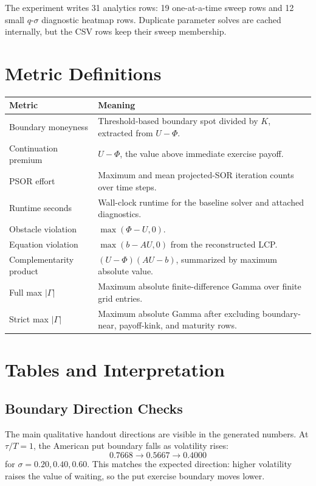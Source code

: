 \documentclass[11pt,a4paper]{article}
\begin{document}
The experiment writes 31 analytics rows: 19 one-at-a-time sweep rows and 12 small \(q\)-\(\sigma\)
diagnostic heatmap rows. Duplicate parameter solves are cached internally, but the CSV rows keep
their sweep membership.

\section{Metric Definitions}

\begin{longtable}{L{0.26\textwidth} L{0.56\textwidth}}
\toprule
Metric & Meaning \\
\midrule
\endhead
Boundary moneyness & Threshold-based boundary spot divided by \(K\), extracted from \(U-\Phi\). \\
Continuation premium & \(U-\Phi\), the value above immediate exercise payoff. \\
PSOR effort & Maximum and mean projected-SOR iteration counts over time steps. \\
Runtime seconds & Wall-clock runtime for the baseline solver and attached diagnostics. \\
Obstacle violation & \(\max(\Phi-U,0)\). \\
Equation violation & \(\max(b-AU,0)\) from the reconstructed LCP. \\
Complementarity product & \((U-\Phi)(AU-b)\), summarized by maximum absolute value. \\
Full max \(|\Gamma|\) & Maximum absolute finite-difference Gamma over finite grid entries. \\
Strict max \(|\Gamma|\) & Maximum absolute Gamma after excluding boundary-near, payoff-kink, and maturity rows. \\
\bottomrule
\end{longtable}

\section{Tables and Interpretation}

\subsection{Boundary Direction Checks}

The main qualitative handout directions are visible in the generated numbers. At \(\tau/T=1\), the
American put boundary falls as volatility rises:
\[
0.7668 \rightarrow 0.5667 \rightarrow 0.4000
\]
for \(\sigma=0.20,0.40,0.60\). This matches the expected direction: higher volatility raises the
value of waiting, so the put exercise boundary moves lower.
\end{document}
